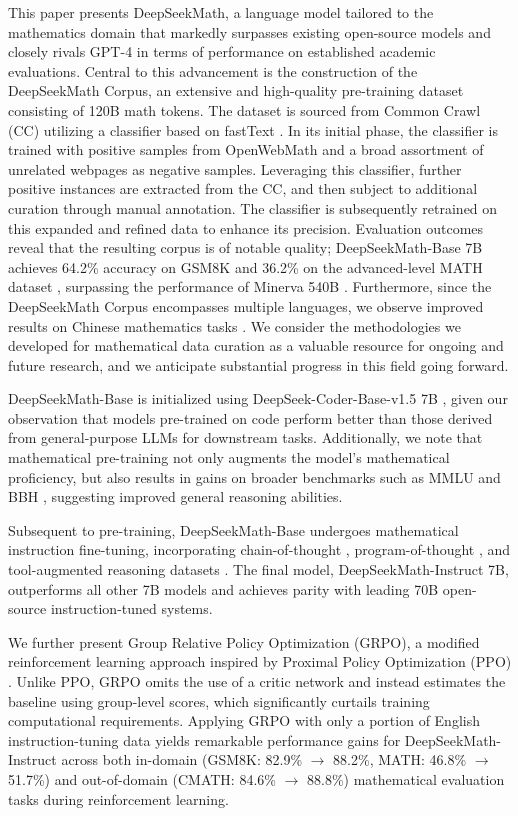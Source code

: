 This paper presents DeepSeekMath, a language model tailored to the mathematics domain that markedly surpasses existing open-source models and closely rivals GPT-4 in terms of performance on established academic evaluations. Central to this advancement is the construction of the DeepSeekMath Corpus, an extensive and high-quality pre-training dataset consisting of 120B math tokens. The dataset is sourced from Common Crawl (CC) utilizing a classifier based on fastText \citep{joulin2016fasttext}. In its initial phase, the classifier is trained with positive samples from OpenWebMath \citep{openwebmath} and a broad assortment of unrelated webpages as negative samples. Leveraging this classifier, further positive instances are extracted from the CC, and then subject to additional curation through manual annotation. The classifier is subsequently retrained on this expanded and refined data to enhance its precision. Evaluation outcomes reveal that the resulting corpus is of notable quality; DeepSeekMath-Base 7B achieves 64.2\% accuracy on GSM8K \citep{gsm8k} and 36.2\% on the advanced-level MATH dataset \citep{MATH}, surpassing the performance of Minerva 540B \citep{minerva}. Furthermore, since the DeepSeekMath Corpus encompasses multiple languages, we observe improved results on Chinese mathematics tasks \citep{wei2023cmath,agieval}. We consider the methodologies we developed for mathematical data curation as a valuable resource for ongoing and future research, and we anticipate substantial progress in this field going forward.

DeepSeekMath-Base is initialized using DeepSeek-Coder-Base-v1.5 7B \citep{deepseek-coder}, given our observation that models pre-trained on code perform better than those derived from general-purpose LLMs for downstream tasks. Additionally, we note that mathematical pre-training not only augments the model's mathematical proficiency, but also results in gains on broader benchmarks such as MMLU \citep{mmlu} and BBH \citep{bbh}, suggesting improved general reasoning abilities.

Subsequent to pre-training, DeepSeekMath-Base undergoes mathematical instruction fine-tuning, incorporating chain-of-thought \citep{cot}, program-of-thought \citep{pot,pal}, and tool-augmented reasoning datasets \citep{tora}. The final model, DeepSeekMath-Instruct 7B, outperforms all other 7B models and achieves parity with leading 70B open-source instruction-tuned systems.

We further present Group Relative Policy Optimization (GRPO), a modified reinforcement learning approach inspired by Proximal Policy Optimization (PPO) \citep{schulman2017proximal}. Unlike PPO, GRPO omits the use of a critic network and instead estimates the baseline using group-level scores, which significantly curtails training computational requirements. Applying GRPO with only a portion of English instruction-tuning data yields remarkable performance gains for DeepSeekMath-Instruct across both in-domain (GSM8K: 82.9\% $\rightarrow$ 88.2\%, MATH: 46.8\% $\rightarrow$ 51.7\%) and out-of-domain (CMATH: 84.6\% $\rightarrow$ 88.8\%) mathematical evaluation tasks during reinforcement learning. 

